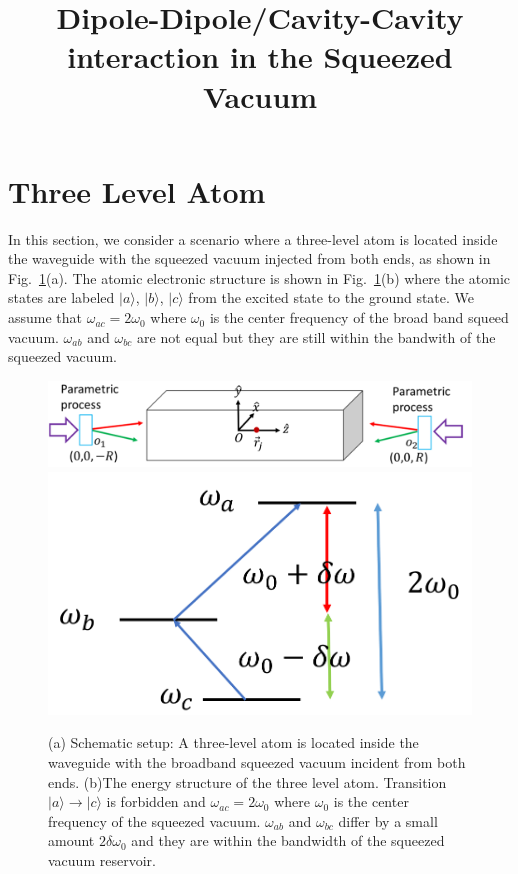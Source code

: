 \documentclass{article}
\begin{document}
\title{Dipole-Dipole/Cavity-Cavity interaction in the Squeezed Vacuum}
\maketitle 




\section{Three Level Atom}
In this section, we consider a scenario where a three-level atom is located inside the waveguide with the squeezed vacuum injected from both ends, as shown in Fig.~\ref{1}(a). The atomic electronic structure is shown in Fig.~\ref{1}(b) where the atomic states are labeled $|a\rangle$, $|b\rangle$, $|c\rangle$ from the excited state to the ground state. We assume that $\omega_{ac}=2\omega_0$ where $\omega_0$ is the center frequency of the broad band squeed vacuum. $\omega_{ab}$ and $\omega_{bc}$ are not equal but they are still within the bandwith of the squeezed vacuum.  
\begin{figure}
\includegraphics[width=0.7\columnwidth]{fig1.png}
\includegraphics[width=0.25\columnwidth]{fig2.png}
\caption{(a) Schematic setup: A three-level atom is located inside the waveguide with the broadband squeezed vacuum incident from both ends. (b)The energy structure of the three level atom. Transition $|a\rangle\rightarrow|c\rangle$ is forbidden and $\omega_{ac}=2\omega_0$ where $\omega_0$ is the center frequency of the squeezed vacuum. $\omega_{ab}$ and $\omega_{bc}$ differ by a small amount $2\delta\omega_0$ and they are within the bandwidth of the squeezed vacuum reservoir.}
\label{1}
\end{figure}
\end{document}
